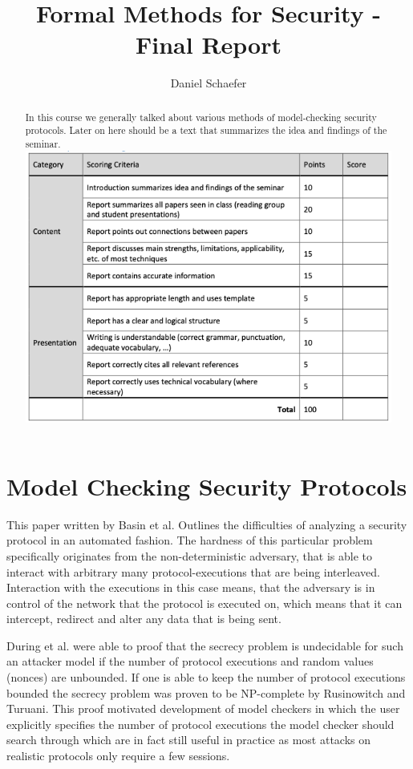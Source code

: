 \documentclass[a4paper,UKenglish]{lipics-v2018}
\title{Formal Methods for Security - Final Report}
\author{Daniel Schaefer}{2549458}{}{}{}
\begin{document}
\maketitle

\begin{abstract}
In this course we generally talked about various methods of model-checking security protocols. Later on here should be a text that summarizes the idea and findings of the seminar.\\

\includegraphics[scale = 0.72]{pictures/grading_scheme}\\
\end{abstract}


\newpage
\section{Model Checking Security Protocols}

This paper written by Basin et al. Outlines the difficulties of analyzing a security protocol in an automated fashion. The hardness of this particular problem specifically originates from the non-deterministic adversary, that is able to interact with arbitrary many protocol-executions that are being interleaved. Interaction with the executions in this case means, that the adversary is in control of the network that the protocol is executed on, which means that it can intercept, redirect and alter any data that is being sent.\cite{model_checking_security_protocols}

During et al. were able to proof that the secrecy problem is undecidable for such an attacker model if the number of protocol executions and random values (nonces) are unbounded.\cite{DLMS99} If one is able to keep the number of protocol executions bounded the secrecy problem was proven to be NP-complete by Rusinowitch and Turuani.\cite{RT01} This proof motivated development of model checkers in which the user explicitly specifies the number of protocol executions the model checker should search through which are in fact still useful in practice as most attacks on realistic protocols only require a few sessions.\cite{model_checking_security_protocols}
\end{document}
